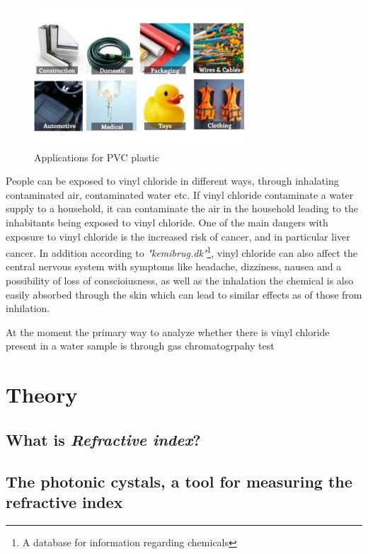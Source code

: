 \documentclass{article}
\begin{document}
\begin{figure}[H]
    \centering
    \includegraphics[width=0.7\textwidth]{pvc_applications.jpg}
    \caption{Applications for PVC plastic\cite{pvc_applications_euroeplas}}
    \label{fig:pvc_applications}
\end{figure}

People can be exposed to vinyl chloride in different ways, through inhalating contaminated air, contaminated water etc.
If vinyl chloride contaminate a water supply to a household, it can contaminate the air in the household leading to the inhabitants being exposed to vinyl chloride. \cite{vc_cancer}
One of the main dangers with exposure to vinyl chloride is the increased risk of cancer, and in particular liver cancer.\cite{vc_cancer}
In addition according to \textit{"kemibrug.dk"}\footnote{A database for information regarding chemicals}, vinyl chloride can also affect the central nervous system with symptoms like headache, dizziness, nausea and a possibility of loss of conscioiusness, as well as the inhalation the chemical is also easily absorbed through the skin which can lead to similar effects as of those from inhilation.\cite{vc_kemibrug}


At the moment the primary way to analyze whether there is vinyl chloride present in a water sample is through gas chromatogrpahy
test

\section{Theory}
\subsection{What is \textit{Refractive index}?}
\subsection{The photonic cystals, a tool for measuring the refractive index}
\end{document}
